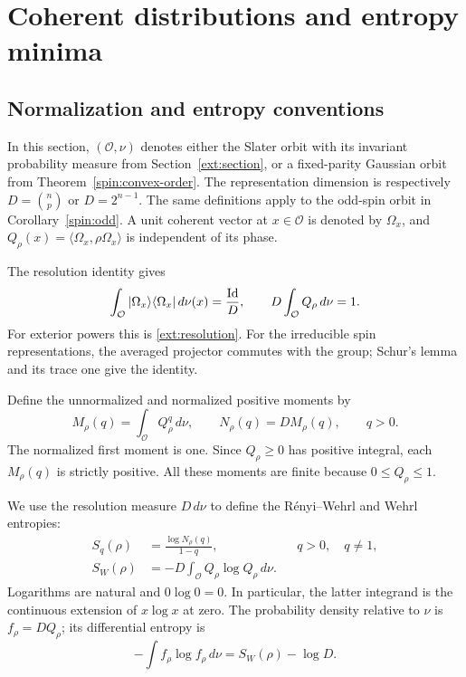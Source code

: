 \section{Coherent distributions and entropy minima}
\label{ent:section}

\subsection{Normalization and entropy conventions}
\label{ent:definitions}

In this section, $(\mathcal O,\nu)$ denotes either the Slater orbit
with its invariant probability measure from Section~\ref{ext:section},
or a fixed-parity Gaussian orbit from Theorem~\ref{spin:convex-order}.
The representation dimension is respectively
$D=\binom np$ or $D=2^{n-1}$. The same definitions apply to the odd-spin
orbit in Corollary~\ref{spin:odd}. A unit coherent vector at $x\in\mathcal O$
is denoted by $\Omega_x$, and
$Q_\rho(x)=\langle\Omega_x,\rho\Omega_x\rangle$ is independent of its
phase.

The resolution identity gives
\begin{equation}
 \int_{\mathcal O}|\Omega_x\rangle\langle\Omega_x|\,d\nu(x)
 =\frac{\mathrm{Id}}{D},
 \qquad D\int_{\mathcal O}Q_\rho\,d\nu=1.
 \label{ent:resolution}
\end{equation}
For exterior powers this is \eqref{ext:resolution}. For the irreducible
spin representations, the averaged projector commutes with the group;
Schur's lemma and its trace one give the identity.

Define the unnormalized and normalized positive moments by
\begin{equation}
 M_\rho(q)=\int_{\mathcal O}Q_\rho^q\,d\nu,
 \qquad N_\rho(q)=D M_\rho(q),\qquad q>0.
 \label{ent:moments-definition}
\end{equation}
The normalized first moment is one. Since $Q_\rho\ge0$ has positive
integral, each $M_\rho(q)$ is strictly positive. All these moments are
finite because $0\le Q_\rho\le1$.

We use the resolution measure $D\,d\nu$ to define the
R\'enyi--Wehrl and Wehrl entropies:
\begin{align}
 S_q(\rho)&=\frac{\log N_\rho(q)}{1-q},
 &&q>0,\quad q\ne1,
 \label{ent:renyi-definition}\\
 S_W(\rho)&=-D\int_{\mathcal O}Q_\rho\log Q_\rho\,d\nu.
 \label{ent:wehrl-definition}
\end{align}
Logarithms are natural and $0\log0=0$. In particular, the latter
integrand is the continuous extension of $x\log x$ at zero.
The probability density relative to $\nu$ is $f_\rho=DQ_\rho$;
its differential entropy is
\begin{equation}
 -\int f_\rho\log f_\rho\,d\nu=S_W(\rho)-\log D.
 \label{ent:output-entropy}
\end{equation}

